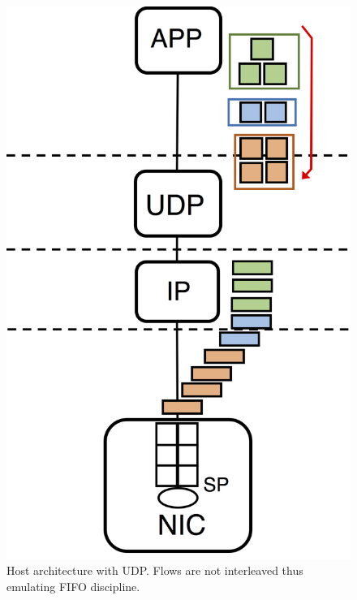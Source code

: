 \begin{figure}[!tb]
	\centering
	\captionsetup{width=.75\linewidth}
	\includegraphics[width=0.3\linewidth]{Chapter4/Figures/udp-config}
	\caption{Host architecture with UDP. Flows are not interleaved thus emulating FIFO discipline.}
	\label{fig:udp-config}
\end{figure}%
